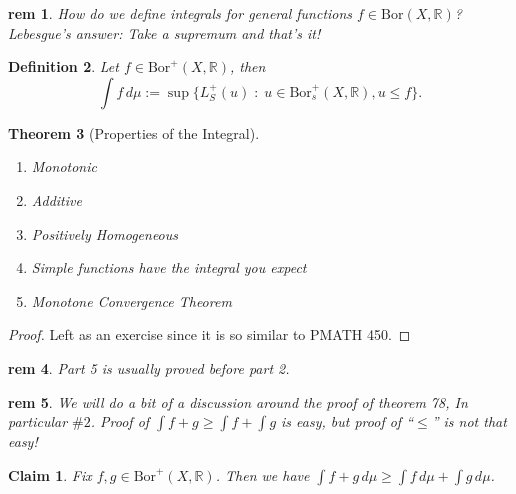\documentclass[letterpaper, 12pt]{article}
\newcommand{\st}{\; : \; }
\newcommand{\fin}{\qquad \quad \hfill \framebox[1.75mm][l]{\,}}
\newcommand{\bR}{\mathbb{R}}
\theoremstyle{stdthm}
\newtheorem{thm}{Theorem}[section]
\theoremstyle{stddef}
\newtheorem{defn}[thm]{Definition}
\newtheorem{rem}[thm]{rem} %
\theoremstyle{stdnonum}
\newtheorem{claim}{Claim}
\theoremstyle{stdqands}
\theoremstyle{stdbold}
\begin{document}
\begin{rem}
How do we define integrals for general functions $f \in \mathrm{Bor}(X,\bR)$? Lebesgue's answer: Take a supremum and that's it! 
\end{rem}
 
\begin{defn}
Let $f \in \mathrm{Bor}^+(X,\bR)$, then 
\[
\int f \, d \mu := \sup \{ L_S^+ (u) \st u \in \mathrm{Bor}_s^+(X,\bR), u \leq f \}.
\]
\end{defn}
 
\begin{thm} [Properties of the Integral] $ $
\begin{enumerate}
\item Monotonic
\item Additive
\item Positively Homogeneous
\item Simple functions have the integral you expect
\item Monotone Convergence Theorem 
\end{enumerate}
\end{thm}

\begin{proof}
Left as an exercise since it is so similar to PMATH 450.
\end{proof}
 
\begin{rem}
Part 5 is usually proved before part 2. 
\end{rem}
 


 
\begin{rem}
We will do a bit of a discussion around the proof of theorem 78, In particular $\#2$. Proof of $\int f+g \geq \int f + \int g$ is easy, but proof of ``$\leq$'' is not that easy! 
\end{rem}
 
\begin{claim}
Fix $f,g \in \mathrm{Bor}^+(X,\bR)$. Then we have $\int f+g \, d \mu \geq \int f \, d\mu + \int g \, d\mu$. 
\end{claim}
\end{document}
